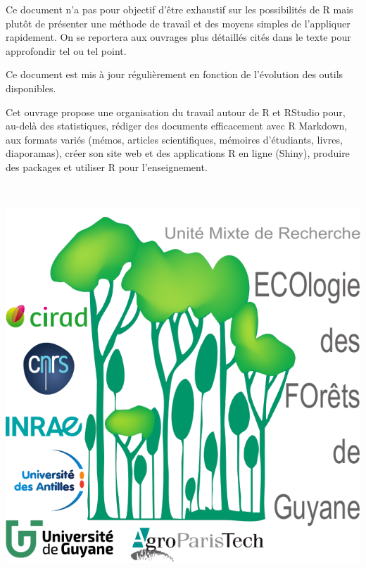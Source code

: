 \documentclass[
  11pt,
  french,
  a4paper,
  extrafontsizes,onecolumn,openright
  ]{memoir}
\begin{document}
\normalsize

Ce document n'a pas pour objectif d'être exhaustif sur les possibilités de R mais plutôt de présenter une méthode de travail et des moyens simples de l'appliquer rapidement.
On se reportera aux ouvrages plus détaillés cités dans le texte pour approfondir tel ou tel point.

Ce document est mis à jour régulièrement en fonction de l'évolution des outils disponibles.



\backmatter
\SmallMargins

%
\printbibliography











\evenpage
\SmallMargins
\thispagestyle{empty}

\begin{normalsize}

\begin{description}

\item[Résumé:]
Cet ouvrage propose une organisation du travail autour de R et RStudio pour, au-delà des statistiques, rédiger des documents efficacement avec R Markdown, aux formats variés (mémos, articles scientifiques, mémoires d'étudiants, livres, diaporamas), créer son site web et des applications R en ligne (Shiny), produire des packages et utiliser R pour l'enseignement.

~\\



\end{description}

\end{normalsize}

\vspace*{\fill}
\centering\includegraphics[width=.3\textwidth]{images/Logo-Lab}
\end{document}
